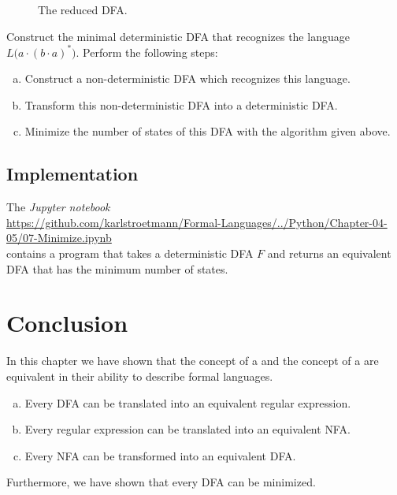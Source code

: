 \begin{figure}[!ht]
  \centering
   \caption{The reduced \textsc{DFA}.}
  \label{fig:gleichwertig.dot}
\end{figure}



\exerciseEng
Construct the minimal deterministic  \textsc{DFA} that recognizes the language 
$L\bigl(a \cdot (b \cdot a)^*\bigr)$.  Perform the following steps:
\begin{enumerate}[(a)]
\item Construct a non-deterministic \textsc{DFA} which recognizes this language.
\item Transform this non-deterministic \textsc{DFA} into a deterministic \textsc{DFA}.
\item Minimize the number of states of this \textsc{DFA} with the algorithm given above.
\end{enumerate}

\subsection{Implementation}
The \textsl{Jupyter notebook} 
\\[0.2cm]
\hspace*{0.3cm}
\href{https://github.com/karlstroetmann/Formal-Languages/blob/master/Python/Chapter-04-05/07-Minimize.ipynb}{https://github.com/karlstroetmann/Formal-Languages/../Python/Chapter-04-05/07-Minimize.ipynb}
\\[0.2cm]
contains a program that takes a deterministic \textsc{DFA} $F$ and returns an equivalent \textsc{DFA} that has
the minimum number of states.


\section{Conclusion}
In this chapter we have shown that the concept of a 
and the concept of a  are equivalent in their ability to describe formal languages.
\begin{enumerate}[(a)]
\item Every \textsc{DFA} can be translated into an equivalent regular expression.
\item Every regular expression can be translated into an equivalent \textsc{NFA}.
\item Every \textsc{NFA} can be transformed into an equivalent \textsc{DFA}.
\end{enumerate}
Furthermore, we have shown that every \textsc{DFA} can be minimized.


